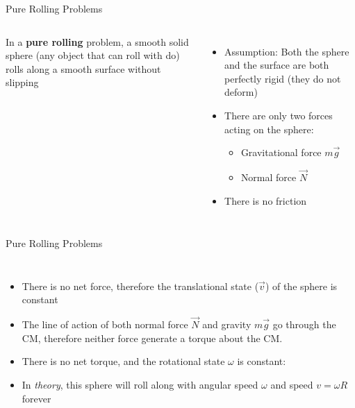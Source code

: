 \documentclass[12pt,compress,aspectratio=169]{beamer}
\begin{document}
\begin{frame}{Pure Rolling Problems}
  \begin{columns}
    

    In a \textbf{pure rolling} problem, a smooth solid sphere (any object that
    can roll with do) rolls along a smooth surface without slipping
    \begin{itemize}
    \item Assumption: Both the sphere and the surface are both perfectly rigid
      (they do not deform)
    \item There are only two forces acting on the sphere:
      \begin{itemize}
      \item Gravitational force $m\vec g$
      \item Normal force $\vec N$
      \end{itemize}
    \item There is no friction
    \end{itemize}
  \end{columns}
\end{frame}



\begin{frame}{Pure Rolling Problems}
  \begin{columns}
    \begin{itemize}
    \item There is no net force, therefore the translational state ($\vec v$)
      of the sphere is constant

    \item The line of action of both normal force $\vec N$ and gravity $m\vec g$
      go through the CM, therefore neither force generate a torque about the CM.
    \item There is no net torque, and the rotational state $\omega$ is
      constant:

    \item In \emph{theory}, this sphere will roll along with angular speed
      $\omega$ and speed $v=\omega R$ forever
    \end{itemize}

    
  \end{columns}
\end{frame}
\end{document}
